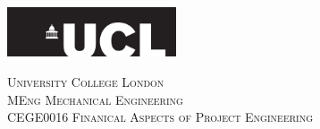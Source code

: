 \begin{titlepage}

  \newcommand{\HRule}{\rule{\linewidth}{0.5mm}} %

  \center
  \includegraphics[width=5cm]{Title/UCL.png}\\[1cm] %


  \center %


  \textsc{\LARGE University College London }\\[1.5cm] %
  \textsc{\Large MEng Mechanical Engineering  }\\[0.5cm] %
  \textsc{\large CEGE0016 Finanical Aspects of Project Engineering }\\[1.5cm] %

  \makeatletter
  { \huge \textsc \@title}\\[1.5cm] %




\end{titlepage}
